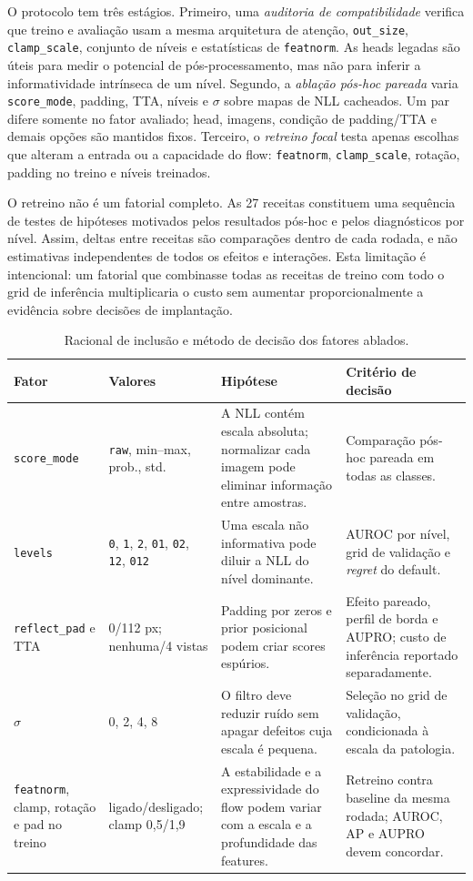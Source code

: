 \documentclass[conference]{IEEEtran}
\begin{document}
O protocolo tem três estágios. Primeiro, uma \textit{auditoria de compatibilidade} verifica que treino e avaliação usam a mesma arquitetura de atenção, \texttt{out\_size}, \texttt{clamp\_scale}, conjunto de níveis e estatísticas de \texttt{featnorm}. As heads legadas são úteis para medir o potencial de pós-processamento, mas não para inferir a informatividade intrínseca de um nível. Segundo, a \textit{ablação pós-hoc pareada} varia \texttt{score\_mode}, padding, TTA, níveis e $\sigma$ sobre mapas de NLL cacheados. Um par difere somente no fator avaliado; head, imagens, condição de padding/TTA e demais opções são mantidos fixos. Terceiro, o \textit{retreino focal} testa apenas escolhas que alteram a entrada ou a capacidade do flow: \texttt{featnorm}, \texttt{clamp\_scale}, rotação, padding no treino e níveis treinados.

O retreino não é um fatorial completo. As 27 receitas constituem uma sequência de testes de hipóteses motivados pelos resultados pós-hoc e pelos diagnósticos por nível. Assim, deltas entre receitas são comparações dentro de cada rodada, e não estimativas independentes de todos os efeitos e interações. Esta limitação é intencional: um fatorial que combinasse todas as receitas de treino com todo o grid de inferência multiplicaria o custo sem aumentar proporcionalmente a evidência sobre decisões de implantação.

\begin{table}[htb]
\centering
\small
\caption{Racional de inclusão e método de decisão dos fatores ablados.}
\label{tab:ablation_rationale}
\begin{tabular}{@{}p{}p{}p{}p{}@{}}
\toprule
\textbf{Fator} & \textbf{Valores} & \textbf{Hipótese} & \textbf{Critério de decisão} \\
\midrule
\texttt{score\_mode} & \texttt{raw}, min--max, prob., std. & A NLL contém escala absoluta; normalizar cada imagem pode eliminar informação entre amostras. & Comparação pós-hoc pareada em todas as classes. \\
\texttt{levels} & \texttt{0}, \texttt{1}, \texttt{2}, \texttt{01}, \texttt{02}, \texttt{12}, \texttt{012} & Uma escala não informativa pode diluir a NLL do nível dominante. & AUROC por nível, grid de validação e \textit{regret} do default. \\
\texttt{reflect\_pad} e TTA & 0/112 px; nenhuma/4 vistas & Padding por zeros e prior posicional podem criar scores espúrios. & Efeito pareado, perfil de borda e AUPRO; custo de inferência reportado separadamente. \\
$\sigma$ & 0, 2, 4, 8 & O filtro deve reduzir ruído sem apagar defeitos cuja escala é pequena. & Seleção no grid de validação, condicionada à escala da patologia. \\
\texttt{featnorm}, clamp, rotação e pad no treino & ligado/desligado; clamp 0,5/1,9 & A estabilidade e a expressividade do flow podem variar com a escala e a profundidade das features. & Retreino contra baseline da mesma rodada; AUROC, AP e AUPRO devem concordar. \\
\bottomrule
\end{tabular}
\end{table}
\end{document}

